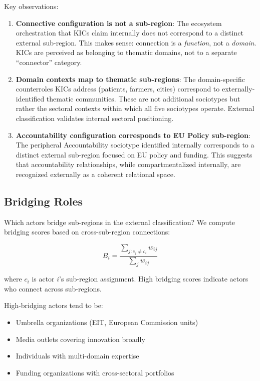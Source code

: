 \documentclass[../main.tex]{subfiles}
\begin{document}
Key observations:

\begin{enumerate}
    \item \textbf{Connective configuration is not a sub-region}: The ecosystem orchestration that KICs claim internally does not correspond to a distinct external sub-region. This makes sense: connection is a \textit{function}, not a \textit{domain}. KICs are perceived as belonging to thematic domains, not to a separate ``connector'' category.

    \item \textbf{Domain contexts map to thematic sub-regions}: The domain-specific counterroles KICs address (patients, farmers, cities) correspond to externally-identified thematic communities. These are not additional sociotypes but rather the sectoral contexts within which all five sociotypes operate. External classification validates internal sectoral positioning.

    \item \textbf{Accountability configuration corresponds to EU Policy sub-region}: The peripheral Accountability sociotype identified internally corresponds to a distinct external sub-region focused on EU policy and funding. This suggests that accountability relationships, while compartmentalized internally, are recognized externally as a coherent relational space.
\end{enumerate}


\subsection{Bridging Roles}

Which actors bridge sub-regions in the external classification? We compute bridging scores based on cross-sub-region connections:

\begin{equation}
    B_i = \frac{\sum_{j: c_j \neq c_i} w_{ij}}{\sum_j w_{ij}}
\end{equation}

where $c_i$ is actor $i$'s sub-region assignment. High bridging scores indicate actors who connect across sub-regions.

High-bridging actors tend to be:
\begin{itemize}
    \item Umbrella organizations (EIT, European Commission units)
    \item Media outlets covering innovation broadly
    \item Individuals with multi-domain expertise
    \item Funding organizations with cross-sectoral portfolios
\end{itemize}
\end{document}
